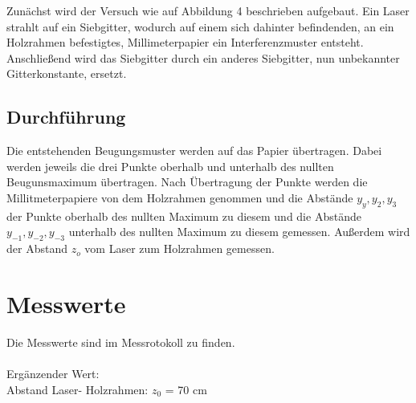 \documentclass[12pt,a4paper,titlepage,headinclude,bibtotoc]{scrartcl}
\begin{document}
Zunächst wird der Versuch wie auf Abbildung 4 beschrieben aufgebaut.
Ein Laser strahlt auf ein Siebgitter, wodurch auf einem sich dahinter befindenden, an ein Holzrahmen befestigtes, Millimeterpapier ein Interferenzmuster entsteht. Anschließend wird das Siebgitter durch ein anderes Siebgitter, nun unbekannter Gitterkonstante, ersetzt.


\subsection{Durchführung}
Die entstehenden Beugungsmuster werden auf das Papier übertragen. Dabei werden jeweils die drei Punkte  oberhalb und unterhalb des nullten Beugunsmaximum übertragen.
Nach Übertragung der Punkte werden die Millitmeterpapiere von dem Holzrahmen genommen und die Abstände $y_{y},y_{2},y_{3}$ der Punkte oberhalb des nullten Maximum zu diesem und die Abstände $y_{-1},y_{-2},y_{-3}$ unterhalb des nullten Maximum zu diesem gemessen. Außerdem wird der Abstand $z_{o}$ vom Laser zum Holzrahmen gemessen.


\section{Messwerte}




Die Messwerte sind im Messrotokoll zu finden.\\\\
Ergänzender Wert:\\
Abstand Laser- Holzrahmen: $z_0$ = 70 cm
\end{document}
